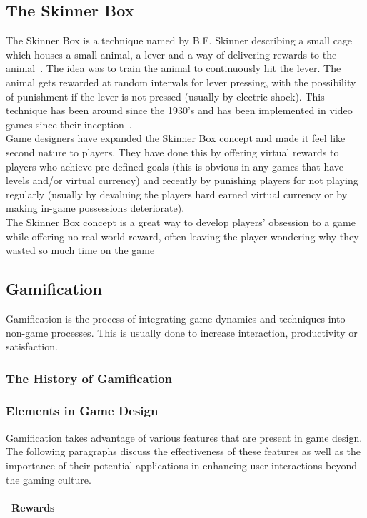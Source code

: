 \documentclass[a4paper,12pt]{article}
\begin{document}
\subsection{The Skinner Box}
The Skinner Box is a technique named by B.F. Skinner describing a small cage which houses a small animal, a lever and a way of delivering rewards to the animal~\citep{openingSkinersBox}. The idea was to train the animal to continuously hit the lever. The animal gets rewarded at random intervals for lever pressing, with the possibility of punishment if the lever is not pressed (usually by electric shock). This technique has been around since the 1930’s and has been implemented in video games since their inception~\citep{theSkinnerBox}.
\\
Game designers have expanded the Skinner Box concept and made it feel like second nature to players. They have done this by offering virtual rewards to players who achieve pre-defined goals (this is obvious in any games that have levels and/or virtual currency) and recently by punishing players for not playing regularly (usually by devaluing the players hard earned virtual currency or by making in-game possessions deteriorate).
\\
The Skinner Box concept is a great way to develop players’ obsession to a game while offering no real world reward, often leaving the player wondering why they wasted so much time on the game~\citep{fiveCreepyWays} 

\subsection{Gamification}
Gamification is the process of integrating game dynamics and techniques into non-game processes. This is usually done to increase interaction, productivity or satisfaction.
\subsubsection{The History of Gamification}
\subsubsection{Elements in Game Design}
Gamification takes advantage of various features that are present in game design. The following paragraphs discuss the effectiveness of these features as well as the importance of their potential applications in enhancing user interactions beyond the gaming culture. 
\paragraph{\indent~Rewards}
\end{document}
